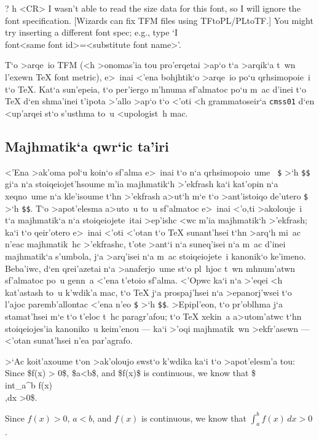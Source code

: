 ? h <CR>
I wasn't able to read the size data for this font,
so I will ignore the font specification.
[Wizards can fix TFM files using TFtoPL/PLtoTF.]
You might try inserting a different font spec;
e.g., type `I\\font<same font id>=<substitute font name>'.
\enduser

T`o >arqe~io {\rm TFM} (<h >onomas'ia tou pro'erqetai >ap`o t`a >arqik`a
t~wn l'exewn {\rm \TeX{} font metric}), e>~inai <'ena bohjhtik`o
>arqe~io po`u qrhsimopoie~i t`o {\rm \TeX}\null.  Kat`a sun'epeia, t`o
per'iergo m'hnuma sf'almatoc po`u m~ac d'inei t`o {\rm \TeX} d`en
shma'inei t'ipota >'allo >ap`o t`o <'oti <h grammatoseir`a {\tt cmss01}
d`en <up'arqei st`o s'usthma to~u <upologist~h mac.

\subsection{Majhmatik`a qwr`ic ta'iri}

<'Ena >ak'oma pol`u koin`o sf'alma e>~inai t`o n`a qrhsimopoio~ume {\tt
\$} >`h {\tt \$\$} gi`a n`a stoiqeiojet'hsoume m'ia majhmatik`h
>'ekfrash ka`i kat'opin n`a xeqno~ume n`a kle'isoume t`hn >'ekfrash
a>ut`h m`e t`o >ant'istoiqo de'utero {\tt \$} >`h {\tt \$\$}.  T`o
>apot'elesma a>uto~u to~u sf'almatoc e>~inai <'o,ti >akolouje~i t`a
majhmatik`a n`a stoiqeiojete~itai >ep'ishc <wc m'ia majhmatik`h >'ekfrash;
ka`i t`o qeir'otero e>~inai <'oti <'otan t`o {\rm \TeX} sunant'hsei t`hn
>arq`h mi~ac n'eac majhmatik~hc >'ekfrashc, t'ote >ant`i n`a suneq'isei
n`a m~ac d'inei majhmatik`a s'umbola, j`a >arq'isei n`a m~ac
stoiqeiojete~i kanonik`o ke'imeno.  Beba'iwc, d`en qrei'azetai n`a
>anaferjo~ume st`o pl~hjoc t~wn mhnum'atwn sf'almatoc po~u genn~a <'ena
t'etoio sf'alma.  <'Opwc ka`i n`a >'eqei <h kat'astash to~u k'wdik'a mac,
t`o {\rm \TeX} j`a prospaj'hsei n`a >epa\-nor\-j'w\-sei t`o l'ajoc
paremb'allontac <'ena n'eo {\tt \$} >`h {\tt \$\$}.  >Epipl'eon, t`o
pr'oblhma j`a stamat'hsei m`e t`o t'e\-loc t~hc paragr'afou; t`o {\rm
\TeX} xekin~a a>utom'atwc t`hn stoiqeiojes'ia kanoniko~u keim'enou ---
ka`i >'oqi majhmatik~wn >ekfr'asewn --- <'otan sunat'hsei n'ea par'agrafo.

>`Ac koit'axoume t`on >ak'oloujo swst`o k'wdika ka`i t`o >apot'elesm'a
tou:  
\beginuser
Since \$f(x) > 0\$, \$a<b\$,  and \$f(x)\$ is continuous, we know that
\$\\int\_{}a\^{}b f(x)\\,dx >0\$.
\enduser

{\rm
Since $f(x) > 0$, $a<b$,  and $f(x)$ is continuous, we know that
$\int_a^b f(x)\,dx >0$.
} %

